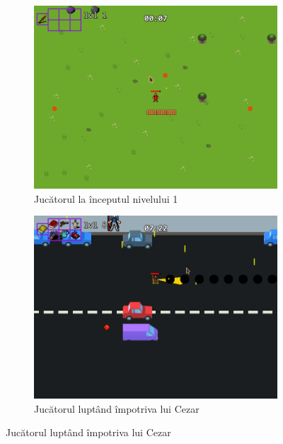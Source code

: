 \documentclass{article}
\begin{document}
    \begin{figure}[H]
        \centering
        \begin{subfigure}{0.45\textwidth}
            \includegraphics[width=\textwidth]{level1-start}
            \centering
            \caption{Jucătorul la începutul nivelului 1}
        \end{subfigure}
        \hfill
        \begin{subfigure}{0.45\textwidth}
            \includegraphics[width=\textwidth]{level2-middle}
            \centering
            \caption{Jucătorul luptând împotriva lui Cezar}
        \end{subfigure}


\end{figure}
\end{document}
